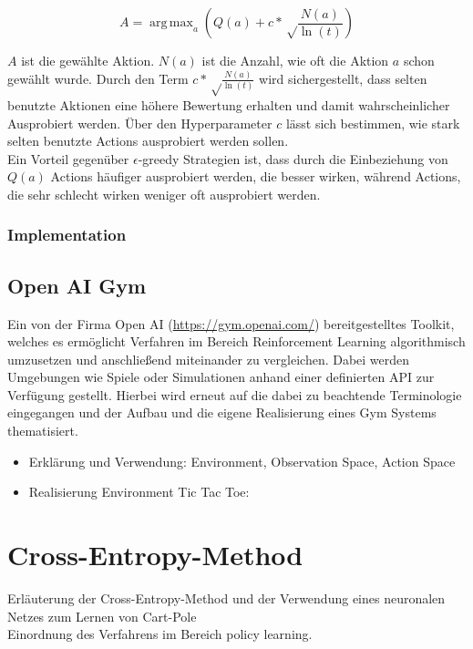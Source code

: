 \documentclass[11pt]{scrartcl}
\DeclareMathOperator*{\argmax}{arg\,max}
\begin{document}
\[ A = \argmax_a\left( Q(a) + c*\sqrt\frac{N(a)}{\ln(t)} \right) \]

\noindent
$A$ ist die gewählte Aktion. $N(a)$ ist die Anzahl, wie oft die Aktion $a$ schon gewählt
wurde. Durch den Term $c*\sqrt\frac{N(a)}{\ln(t)}$ wird sichergestellt, dass selten
benutzte Aktionen eine höhere Bewertung erhalten und damit wahrscheinlicher Ausprobiert
werden. Über den Hyperparameter $c$ lässt sich bestimmen, wie stark selten benutzte
Actions ausprobiert werden sollen.\\
Ein Vorteil gegenüber $\epsilon$-greedy Strategien ist, dass durch die Einbeziehung von
$Q(a)$ Actions häufiger ausprobiert werden, die besser wirken, während Actions, die sehr
schlecht wirken weniger oft ausprobiert werden.

\subsubsection{Implementation}

\newpage
\subsection{Open AI Gym}
Ein von der Firma Open AI (\url{https://gym.openai.com/}) bereitgestelltes Toolkit,
welches es ermöglicht Verfahren im Bereich Reinforcement Learning algorithmisch umzusetzen
und anschließend miteinander zu vergleichen. Dabei werden Umgebungen wie Spiele oder
Simulationen anhand einer definierten API zur Verfügung gestellt. Hierbei wird erneut auf
die dabei zu beachtende Terminologie eingegangen und der Aufbau und die eigene
Realisierung eines Gym Systems thematisiert.

\begin{itemize}
\itemsep0pt
\item Erklärung und Verwendung: Environment, Observation Space, Action Space
\item Realisierung Environment Tic Tac Toe:
\end{itemize}

\section{Cross-Entropy-Method}
Erläuterung der Cross-Entropy-Method und der Verwendung eines neuronalen Netzes zum Lernen
von Cart-Pole
\\
Einordnung des Verfahrens im Bereich policy learning.
\end{document}
